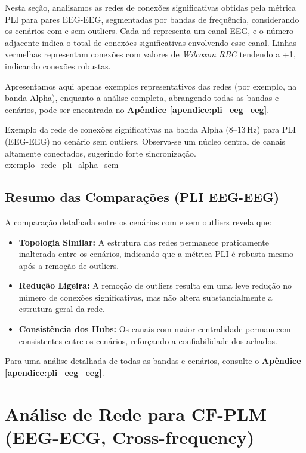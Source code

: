 Nesta seção, analisamos as redes de conexões significativas obtidas pela métrica PLI para pares EEG-EEG, segmentadas por bandas de frequência, considerando os cenários com e sem outliers. Cada nó representa um canal EEG, e o número adjacente indica o total de conexões significativas envolvendo esse canal. Linhas vermelhas representam conexões com valores de \emph{Wilcoxon RBC} tendendo a +1, indicando conexões robustas.

Apresentamos aqui apenas exemplos representativos das redes (por exemplo, na banda Alpha), enquanto a análise completa, abrangendo todas as bandas e cenários, pode ser encontrada no \textbf{Apêndice \ref{apendice:pli_eeg_eeg}}.

{Exemplo da rede de conexões significativas na banda Alpha (8--13\,Hz) para PLI (EEG-EEG) no cenário sem outliers. Observa-se um núcleo central de canais altamente conectados, sugerindo forte sincronização.}
{exemplo_rede_pli_alpha_sem}


\subsection{Resumo das Comparações (PLI EEG-EEG)}

A comparação detalhada entre os cenários com e sem outliers revela que:
\begin{itemize}
    \item \textbf{Topologia Similar:} A estrutura das redes permanece praticamente inalterada entre os cenários, indicando que a métrica PLI é robusta mesmo após a remoção de outliers.
    \item \textbf{Redução Ligeira:} A remoção de outliers resulta em uma leve redução no número de conexões significativas, mas não altera substancialmente a estrutura geral da rede.
    \item \textbf{Consistência dos Hubs:} Os canais com maior centralidade permanecem consistentes entre os cenários, reforçando a confiabilidade dos achados.
\end{itemize}

Para uma análise detalhada de todas as bandas e cenários, consulte o \textbf{Apêndice \ref{apendice:pli_eeg_eeg}}.

\section{Análise de Rede para CF-PLM (EEG-ECG, Cross-frequency)}
\label{sec:rede_cfplm_eeg_ecg}

